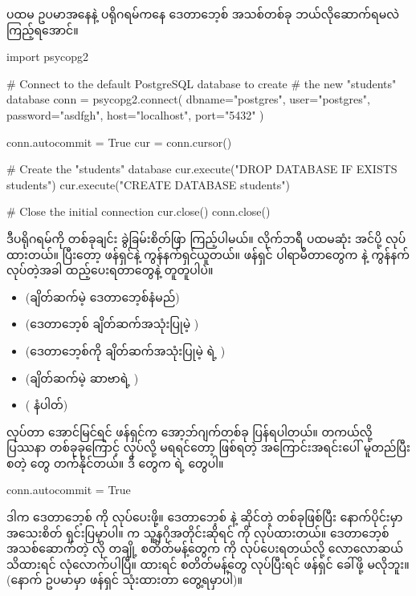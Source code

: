 ပထမ ဥပမာအနေနဲ့  ပရိုဂရမ်ကနေ  ဒေတာဘေ့စ် အသစ်တစ်ခု ဘယ်လိုဆောက်ရမလဲ ကြည့်ရအောင်။ 
%
\begin{py}
import psycopg2

# Connect to the default PostgreSQL database to create 
# the new "students" database
conn = psycopg2.connect(
    dbname="postgres",
    user="postgres",
    password="asdfgh",
    host="localhost",
    port="5432"
)

conn.autocommit = True
cur = conn.cursor()

# Create the "students" database
cur.execute("DROP DATABASE IF EXISTS students")
cur.execute("CREATE DATABASE students")

# Close the initial connection
cur.close()
conn.close()
\end{py}
%

ဒီပရိုဂရမ်ကို တစ်ခုချင်း ခွဲခြမ်းစိတ်ဖြာ ကြည့်ပါမယ်။  လိုက်ဘရီ ပထမဆုံး အင်ပို့ လုပ်ထားတယ်။ ပြီးတော့  ဖန်ရှင်နဲ့ ကွန်နက်ရှင်ယူတယ်။  ဖန်ရှင် ပါရာမီတာတွေက  နဲ့ ကွန်နက်လုပ်တဲ့အခါ ထည့်ပေးရတာတွေနဲ့ တူတူပါပဲ။
%
\begin{itemize}
    \item {} (ချိတ်ဆက်မဲ့ ဒေတာဘေ့စ်နံမည်) 
    \item {} (ဒေတာဘေ့စ် ချိတ်ဆက်အသုံးပြုမဲ့ ) 
    \item {} (ဒေတာဘေ့စ်ကို ချိတ်ဆက်အသုံးပြုမဲ့  ရဲ့ )
    \item {} (ချိတ်ဆက်မဲ့ ဆာဗာရဲ့ )
    \item {} ( နံပါတ်)
\end{itemize}
%

 လုပ်တာ အောင်မြင်ရင်  ဖန်ရှင်က  အော့ဘ်ဂျက်တစ်ခု ပြန်ရပါတယ်။ တကယ်လို့ ပြဿနာ တစ်ခုခုကြောင့်  လုပ်လို့ မရရင်တော့ ဖြစ်ရတဲ့ အကြောင်းအရင်းပေါ် မူတည်ပြီး \fEn{,}  စတဲ့  တွေ တက်နိုင်တယ်။ ဒီ  တွေက   ရဲ့  တွေပါ။


%
\begin{py}
conn.autocommit = True
\end{py}
%
ဒါက ဒေတာဘေ့စ်  ကို  လုပ်ပေးဖို့။ ဒေတာဘေ့စ်  နဲ့ ဆိုင်တဲ့  တစ်ခုဖြစ်ပြီး နောက်ပိုင်းမှာ အသေးစိတ် ရှင်းပြမှာပါ။  က သူ့နဂိုအတိုင်းဆိုရင်   ကို  လုပ်ထားတယ်။ ဒေတာဘေ့စ် အသစ်ဆောက်တဲ့  လို တချို့  စတိတ်မန့်တွေက  ကို  လုပ်ပေးရတယ်လို့ လောလောဆယ် သိထားရင် လုံလောက်ပါပြီ။  ထားရင်  စတိတ်မန့်တွေ  လုပ်ပြီးရင်  ဖန်ရှင် ခေါ်ဖို့ မလိုဘူး။ (နောက် ဥပမာမှာ  ဖန်ရှင် သုံးထားတာ တွေ့ရမှာပါ)။

